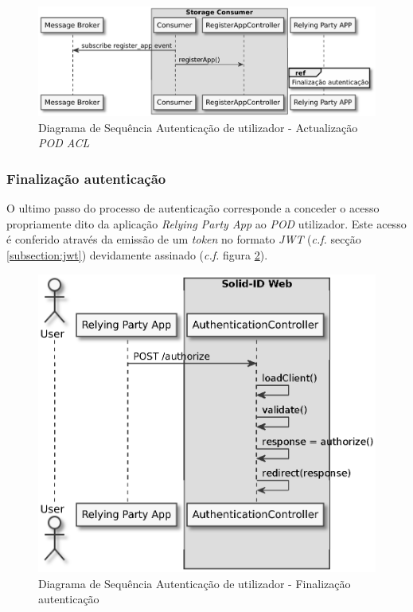 \begin{figure}[H]
    \begin{center}
    \includegraphics[width=0.8 \textwidth]{figures/authentication_sd_3.eps}
    \caption{Diagrama de Sequência Autenticação de utilizador - Actualização \emph{POD ACL}}
    \label{autenticacao_sd3}
    \end{center}
\end{figure}

\subsubsection{Finalização autenticação}

O ultimo passo do processo de autenticação corresponde a conceder o acesso propriamente dito da aplicação \emph{Relying Party App} ao \emph{POD} utilizador. Este acesso é conferido através da emissão de um \emph{token} no formato \emph{JWT} (\emph{c.f.} secção \ref{subsection:jwt}) devidamente assinado (\emph{c.f.} figura \ref{autenticacao_sd4}).

\begin{figure}[H]
    \begin{center}
    \includegraphics[width=0.6 \textwidth]{figures/authentication_sd_4.eps}
    \caption{Diagrama de Sequência Autenticação de utilizador - Finalização autenticação}
    \label{autenticacao_sd4}
    \end{center}
\end{figure}

